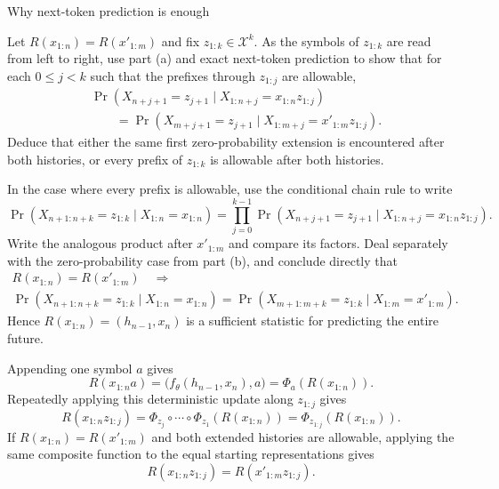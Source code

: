 \begin{exercise}[Extension]{Why next-token prediction is enough}
\begin{parts}
    \item Let $R(x_{1:n})=R(x'_{1:m})$ and fix
      $z_{1:k}\in\mathcal X^k$. As the symbols of $z_{1:k}$ are read from
      left to right, use part (a) and exact next-token prediction to show that
      for each $0\leq j<k$ such that the prefixes through $z_{1:j}$ are
      allowable,
      \[
        \begin{aligned}
        &\Pr\!\left(
          X_{n+j+1}=z_{j+1}
          \mid X_{1:n+j}=x_{1:n}z_{1:j}
        \right)\\
        &\qquad=
        \Pr\!\left(
          X_{m+j+1}=z_{j+1}
          \mid X_{1:m+j}=x'_{1:m}z_{1:j}
        \right).
        \end{aligned}
      \]
      Deduce that either the same first zero-probability extension is
      encountered after both histories, or every prefix of $z_{1:k}$ is
      allowable after both histories.

    \item In the case where every prefix is allowable, use the conditional
      chain rule to write
      \[
        \Pr\!\left(
          X_{n+1:n+k}=z_{1:k}\mid X_{1:n}=x_{1:n}
        \right)
        =
        \prod_{j=0}^{k-1}
        \Pr\!\left(
          X_{n+j+1}=z_{j+1}
          \mid X_{1:n+j}=x_{1:n}z_{1:j}
        \right).
      \]
      Write the analogous product after $x'_{1:m}$ and compare its factors.
      Deal separately with the zero-probability case from part (b), and
      conclude directly that
      \[
        \begin{gathered}
          R(x_{1:n})=R(x'_{1:m})
          \quad\Longrightarrow\\[1mm]
          \Pr\!\left(
            X_{n+1:n+k}=z_{1:k}\mid X_{1:n}=x_{1:n}
          \right)
          =
          \Pr\!\left(
            X_{m+1:m+k}=z_{1:k}\mid X_{1:m}=x'_{1:m}
          \right).
        \end{gathered}
      \]
      Hence $R(x_{1:n})=(h_{n-1},x_n)$ is a sufficient statistic for
      predicting the entire future.
  \end{parts}

  \begin{solution}
    \begin{parts}
      \item Appending one symbol $a$ gives
        \[
          R(x_{1:n}a)
            =\bigl(f_\theta(h_{n-1},x_n),a\bigr)
            =\Phi_a\!\left(R(x_{1:n})\right).
        \]
        Repeatedly applying this deterministic update along $z_{1:j}$ gives
        \[
          R(x_{1:n}z_{1:j})
            =\Phi_{z_j}\circ\cdots\circ\Phi_{z_1}
              \!\left(R(x_{1:n})\right)
            =\Phi_{z_{1:j}}\!\left(R(x_{1:n})\right).
        \]
        If $R(x_{1:n})=R(x'_{1:m})$ and both extended histories are
        allowable, applying the same composite function to the equal starting
        representations gives
        \[
          R(x_{1:n}z_{1:j})=R(x'_{1:m}z_{1:j}).
        \]


\end{parts}
\end{solution}
\end{exercise}
